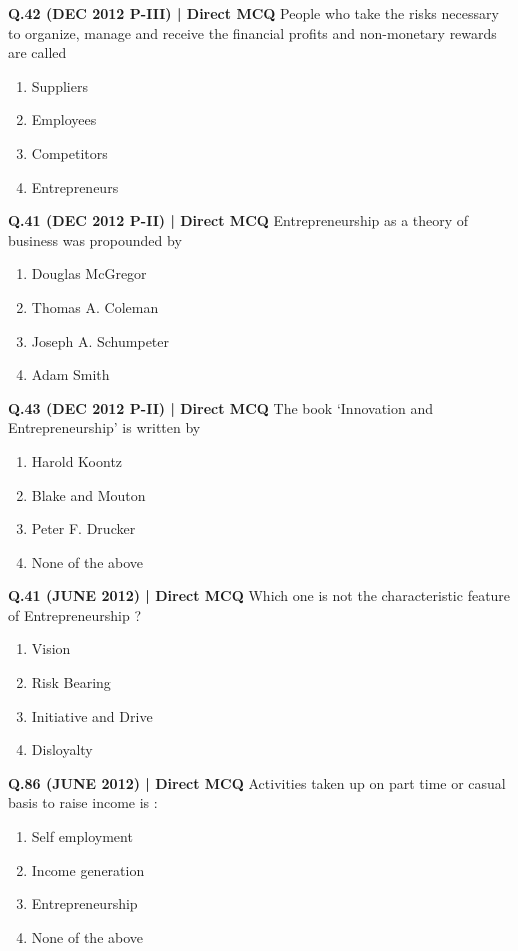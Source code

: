 \documentclass{article}
\begin{document}
\textbf{Q.42 (DEC 2012 P-III) | Direct MCQ}
People who take the risks necessary to organize, manage and receive the financial profits and non-monetary rewards are called
\begin{enumerate}[label=(\arabic*)]
    \item Suppliers
    \item Employees
    \item Competitors
    \item Entrepreneurs
\end{enumerate}

\textbf{Q.41 (DEC 2012 P-II) | Direct MCQ}
Entrepreneurship as a theory of business was propounded by
\begin{enumerate}[label=(\arabic*)]
    \item Douglas McGregor
    \item Thomas A. Coleman
    \item Joseph A. Schumpeter
    \item Adam Smith
\end{enumerate}

\textbf{Q.43 (DEC 2012 P-II) | Direct MCQ}
The book ‘Innovation and Entrepreneurship’ is written by
\begin{enumerate}[label=(\arabic*)]
    \item Harold Koontz
    \item Blake and Mouton
    \item Peter F. Drucker
    \item None of the above
\end{enumerate}

\textbf{Q.41 (JUNE 2012) | Direct MCQ}
Which one is not the characteristic feature of Entrepreneurship ?
\begin{enumerate}[label=(\arabic*)]
    \item Vision
    \item Risk Bearing
    \item Initiative and Drive
    \item Disloyalty
\end{enumerate}

\textbf{Q.86 (JUNE 2012) | Direct MCQ}
Activities taken up on part time or casual basis to raise income is :
\begin{enumerate}[label=(\arabic*)]
    \item Self employment
    \item Income generation
    \item Entrepreneurship
    \item None of the above
\end{enumerate}
\end{document}
